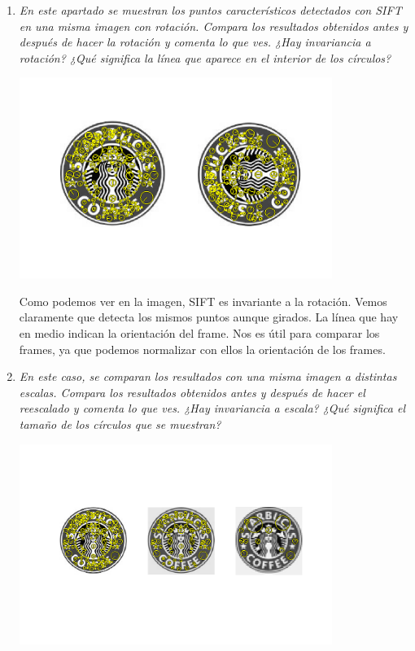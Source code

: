 \documentclass{article}
\begin{document}
\begin{enumerate}
\begin{enumerate}
 \item \textit{En  este  apartado  se muestran  los  puntos  característicos  detectados  con SIFT  en  una  misma  imagen  con  rotación.  Compara  los  resultados 
obtenidos antes y después de hacer la rotación y comenta lo que ves. ¿Hay 
invariancia a rotación? ¿Qué significa la línea que aparece en el interior de 
los círculos?}

\begin{center}
	\includegraphics[width=0.8\textwidth]{ej34b.png}
\end{center}

Como podemos ver en la imagen, SIFT es invariante a la rotación. Vemos claramente que detecta los mismos puntos aunque girados. La línea que hay en medio indican la orientación del frame. Nos es útil para comparar los frames, ya que podemos normalizar con ellos la orientación de los frames.

 \item \textit{En  este  caso,  se  comparan  los  resultados  con  una  misma  imagen  a 
distintas  escalas.  Compara  los  resultados  obtenidos  antes  y  después  de 
hacer el reescalado y comenta lo que ves. ¿Hay invariancia a escala? ¿Qué 
significa el tamaño de los círculos que se muestran?}

\begin{center}
	\includegraphics[width=0.8\textwidth]{ej34c.png}
\end{center}


\end{enumerate}
\end{enumerate}
\end{document}

